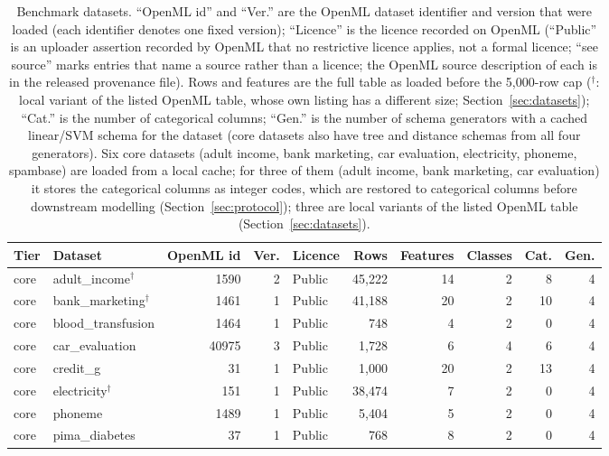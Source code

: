 \begin{table}[htbp]
\caption{Benchmark datasets. ``OpenML id'' and ``Ver.'' are the OpenML dataset identifier and version that were loaded (each identifier denotes one fixed version); ``Licence'' is the licence recorded on OpenML (``Public'' is an uploader assertion recorded by OpenML that no restrictive licence applies, not a formal licence; ``see source'' marks entries that name a source rather than a licence; the OpenML source description of each is in the released provenance file). Rows and features are the full table as loaded before the 5{,}000-row cap ($^{\dagger}$: local variant of the listed OpenML table, whose own listing has a different size; Section~\ref{sec:datasets}); ``Cat.'' is the number of categorical columns; ``Gen.'' is the number of schema generators with a cached linear/SVM schema for the dataset (core datasets also have tree and distance schemas from all four generators). Six core datasets (adult income, bank marketing, car evaluation, electricity, phoneme, spambase) are loaded from a local cache; for three of them (adult income, bank marketing, car evaluation) it stores the categorical columns as integer codes, which are restored to categorical columns before downstream modelling (Section~\ref{sec:protocol}); three are local variants of the listed OpenML table (Section~\ref{sec:datasets}).}\label{tab:datasets}
\centering
\scriptsize
\begin{adjustbox}{max width=\linewidth}
\begin{tabular}{llrrlrrrrr}
\toprule
Tier & Dataset & OpenML id & Ver. & Licence & Rows & Features & Classes & Cat. & Gen. \\
\midrule
core & adult\_income$^{\dagger}$ & 1590 & 2 & Public & 45{,}222 & 14 & 2 & 8 & 4 \\
core & bank\_marketing$^{\dagger}$ & 1461 & 1 & Public & 41{,}188 & 20 & 2 & 10 & 4 \\
core & blood\_transfusion & 1464 & 1 & Public & 748 & 4 & 2 & 0 & 4 \\
core & car\_evaluation & 40975 & 3 & Public & 1{,}728 & 6 & 4 & 6 & 4 \\
core & credit\_g & 31 & 1 & Public & 1{,}000 & 20 & 2 & 13 & 4 \\
core & electricity$^{\dagger}$ & 151 & 1 & Public & 38{,}474 & 7 & 2 & 0 & 4 \\
core & phoneme & 1489 & 1 & Public & 5{,}404 & 5 & 2 & 0 & 4 \\
core & pima\_diabetes & 37 & 1 & Public & 768 & 8 & 2 & 0 & 4 \\

\end{tabular}
\end{adjustbox}
\end{table}
